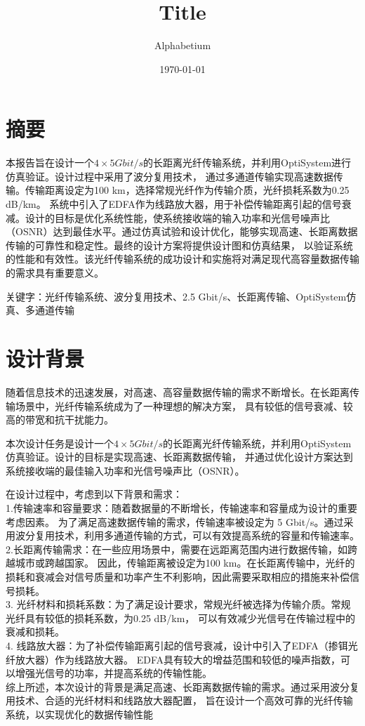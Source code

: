 \documentclass[12pt, a4paper, oneside]{article}
\title{Title}
\date{\today}
\author{Alphabetium}
\begin{document}
\begin{spacing}{2.0}
\maketitle
\section{摘要}
本报告旨在设计一个$4\times 5 Gbit/s$的长距离光纤传输系统，并利用OptiSystem进行仿真验证。设计过程中采用了波分复用技术，
通过多通道传输实现高速数据传输。传输距离设定为100 km，选择常规光纤作为传输介质，光纤损耗系数为0.25 dB/km。
系统中引入了EDFA作为线路放大器，用于补偿传输距离引起的信号衰减。设计的目标是优化系统性能，使系统接收端的输入功率和光信号噪声比
（OSNR）达到最佳水平。通过仿真试验和设计优化，能够实现高速、长距离数据传输的可靠性和稳定性。最终的设计方案将提供设计图和仿真结果，
以验证系统的性能和有效性。该光纤传输系统的成功设计和实施将对满足现代高容量数据传输的需求具有重要意义。

关键字：光纤传输系统、波分复用技术、2.5 Gbit/s、长距离传输、OptiSystem仿真、多通道传输
\clearpage     %
\section{设计背景}
随着信息技术的迅速发展，对高速、高容量数据传输的需求不断增长。在长距离传输场景中，光纤传输系统成为了一种理想的解决方案，
具有较低的信号衰减、较高的带宽和抗干扰能力。

本次设计任务是设计一个$4\times 5 Gbit/s$的长距离光纤传输系统，并利用OptiSystem仿真验证。设计的目标是实现高速、长距离数据传输，
并通过优化设计方案达到系统接收端的最佳输入功率和光信号噪声比（OSNR）。

在设计过程中，考虑到以下背景和需求：
\\
1.传输速率和容量要求：随着数据量的不断增长，传输速率和容量成为设计的重要考虑因素。
为了满足高速数据传输的需求，传输速率被设定为 5 Gbit/s。通过采用波分复用技术，利用多通道传输的方式，可以有效提高系统的容量和传输速率。
\\
2.长距离传输需求：在一些应用场景中，需要在远距离范围内进行数据传输，如跨越城市或跨越国家。
因此，传输距离被设定为100 km。在长距离传输中，光纤的损耗和衰减会对信号质量和功率产生不利影响，因此需要采取相应的措施来补偿信号损耗。
\\
3.	光纤材料和损耗系数：为了满足设计要求，常规光纤被选择为传输介质。常规光纤具有较低的损耗系数，为0.25 dB/km，
可以有效减少光信号在传输过程中的衰减和损耗。
\\
4.	线路放大器：为了补偿传输距离引起的信号衰减，设计中引入了EDFA（掺铒光纤放大器）作为线路放大器。
EDFA具有较大的增益范围和较低的噪声指数，可以增强光信号的功率，并提高系统的传输性能。
\\
综上所述，本次设计的背景是满足高速、长距离数据传输的需求。通过采用波分复用技术、合适的光纤材料和线路放大器配置，
旨在设计一个高效可靠的光纤传输系统，以实现优化的数据传输性能

\end{spacing}
\end{document}
